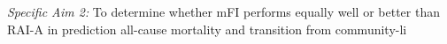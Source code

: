 \emph{Specific Aim 2:} To determine whether mFI performs equally well or better than RAI-A in prediction all-cause mortality and transition from community-li